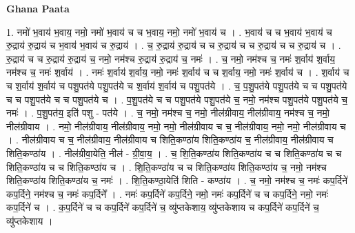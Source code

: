 \documentclass[17pt]{extarticle}
\begin{document}
\textbf{Ghana Paata } \newline

1. नमो॑ भ॒वाय॑ भ॒वाय॒ नमो॒ नमो॑ भ॒वाय॑ च च भ॒वाय॒ नमो॒ नमो॑ भ॒वाय॑ च । . भ॒वाय॑ च च भ॒वाय॑ भ॒वाय॑ च रु॒द्राय॑ रु॒द्राय॑ च भ॒वाय॑ भ॒वाय॑ च रु॒द्राय॑ । . च॒ रु॒द्राय॑ रु॒द्राय॑ च च रु॒द्राय॑ च च रु॒द्राय॑ च च रु॒द्राय॑ च । . रु॒द्राय॑ च च रु॒द्राय॑ रु॒द्राय॑ च॒ नमो॒ नम॑श्च रु॒द्राय॑ रु॒द्राय॑ च॒ नमः॑ । . च॒ नमो॒ नम॑श्च च॒ नमः॑ श॒र्वाय॑ श॒र्वाय॒ नम॑श्च च॒ नमः॑ श॒र्वाय॑ । . नमः॑ श॒र्वाय॑ श॒र्वाय॒ नमो॒ नमः॑ श॒र्वाय॑ च च श॒र्वाय॒ नमो॒ नमः॑ श॒र्वाय॑ च । . श॒र्वाय॑ च च श॒र्वाय॑ श॒र्वाय॑ च पशु॒पत॑ये पशु॒पत॑ये च श॒र्वाय॑ श॒र्वाय॑ च पशु॒पत॑ये । . च॒ प॒शु॒पत॑ये पशु॒पत॑ये च च पशु॒पत॑ये च च पशु॒पत॑ये च च पशु॒पत॑ये च । . प॒शु॒पत॑ये च च पशु॒पत॑ये पशु॒पत॑ये च॒ नमो॒ नम॑श्च पशु॒पत॑ये पशु॒पत॑ये च॒ नमः॑ । . प॒शु॒पत॑य॒ इति॑ पशु - पत॑ये । . च॒ नमो॒ नम॑श्च च॒ नमो॒ नील॑ग्रीवाय॒ नील॑ग्रीवाय॒ नम॑श्च च॒ नमो॒ नील॑ग्रीवाय । . नमो॒ नील॑ग्रीवाय॒ नील॑ग्रीवाय॒ नमो॒ नमो॒ नील॑ग्रीवाय च च॒ नील॑ग्रीवाय॒ नमो॒ नमो॒ नील॑ग्रीवाय च । . नील॑ग्रीवाय च च॒ नील॑ग्रीवाय॒ नील॑ग्रीवाय च शिति॒कण्ठा॑य शिति॒कण्ठा॑य च॒ नील॑ग्रीवाय॒ नील॑ग्रीवाय च शिति॒कण्ठा॑य । . नील॑ग्रीवा॒येति॒ नील॑ - ग्री॒वा॒य॒ । . च॒ शि॒ति॒कण्ठा॑य शिति॒कण्ठा॑य च च शिति॒कण्ठा॑य च च शिति॒कण्ठा॑य च च शिति॒कण्ठा॑य च । . शि॒ति॒कण्ठा॑य च च शिति॒कण्ठा॑य शिति॒कण्ठा॑य च॒ नमो॒ नम॑श्च शिति॒कण्ठा॑य शिति॒कण्ठा॑य च॒ नमः॑ । . शि॒ति॒कण्ठा॒येति॑ शिति - कण्ठा॑य । . च॒ नमो॒ नम॑श्च च॒ नमः॑ कप॒र्दिने॑ कप॒र्दिने॒ नम॑श्च च॒ नमः॑ कप॒र्दिने᳚ । . नमः॑ कप॒र्दिने॑ कप॒र्दिने॒ नमो॒ नमः॑ कप॒र्दिने॑ च च कप॒र्दिने॒ नमो॒ नमः॑ कप॒र्दिने॑ च । . क॒प॒र्दिने॑ च च कप॒र्दिने॑ कप॒र्दिने॑ च॒ व्यु॑प्तकेशाय॒ व्यु॑प्तकेशाय च कप॒र्दिने॑ कप॒र्दिने॑ च॒ व्यु॑प्तकेशाय । \newline
\end{document}
